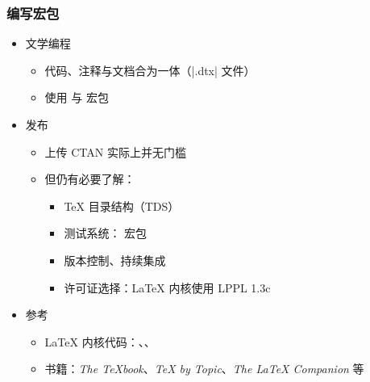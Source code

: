 \begin{frame}[fragile]
\frametitle{编写宏包}
\begin{itemize}
  \item<+-> 文学编程

    \begin{itemize}
      \item 代码、注释与文档合为一体（|.dtx| 文件）
      \item 使用  与  宏包
    \end{itemize}

  \item<+-> 发布

    \begin{itemize}
      \item 上传 CTAN 实际上并无门槛
      \item 但仍有必要了解：

        \begin{itemize}
          \item \TeX{} 目录结构（TDS）
          \item 测试系统： 宏包
          \item 版本控制、持续集成
          \item 许可证选择：\LaTeX{} 内核使用 LPPL 1.3c
        \end{itemize}
    \end{itemize}

  \item<+-> 参考

    \begin{itemize}
      \item \LaTeX{} 内核代码：、、
      \item 书籍：\emph{The \TeX book}、\emph{\TeX{} by Topic}、\emph{The \LaTeX{} Companion} 等
    \end{itemize}
\end{itemize}
\end{frame}

